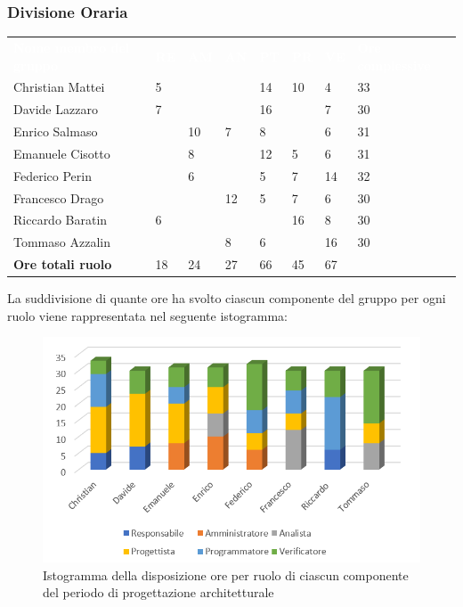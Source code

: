 \subsubsection{Divisione Oraria}
{
	\renewcommand{\arraystretch}{2}
	\centering
	\begin{longtable}{ C{5cm} C{1cm} C{1cm} C{1cm} C{1cm} C{1cm} C{1cm} C{3cm}}
		\textcolor{white}{\textbf{Nome membro del gruppo}} & \textcolor{white}{\textbf{RE}} & \textcolor{white}{\textbf{AM}} & \textcolor{white}{\textbf{AN}} & \textcolor{white}{\textbf{PT}} & \textcolor{white}{\textbf{PR}} & \textcolor{white}{\textbf{VE}} & \textcolor{white}{\textbf{Ore complessive}}\\	
        
        Christian Mattei & 5 & & & 14 & 10 & 4 & 33\\
        Davide Lazzaro & 7 & & & 16 & & 7 & 30 \\
        Enrico Salmaso & & 10 & 7 & 8 & & 6 & 31 \\
        Emanuele Cisotto & & 8 & & 12 & 5 & 6 & 31 \\
        Federico Perin & & 6 & & 5 & 7 & 14 &  32\\
        Francesco Drago & & & 12 & 5 & 7 & 6 & 30 \\
        Riccardo Baratin & 6 & & & & 16 & 8 & 30\\
        Tommaso Azzalin & & & 8 & 6 & & 16 & 30\\
        \textbf{Ore totali ruolo} & 18 & 24 & 27 & 66 & 45 & 67 & \\
		
	\end{longtable}
}

La suddivisione di quante ore ha svolto ciascun componente del gruppo per ogni ruolo viene rappresentata nel seguente istogramma:

\begin{figure}[h]
	\centering
	\includegraphics[scale=0.6]{sezioni/Istogrammi/IstogrammaProgettArchitetturale.png}
	\caption{Istogramma della disposizione ore per ruolo di ciascun componente del periodo di progettazione architetturale}
\end{figure}

